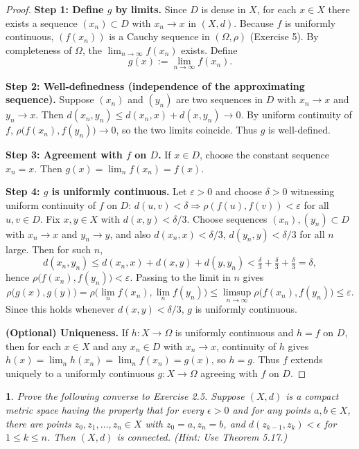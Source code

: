 \documentclass[12pt, a4paper]{report}
\theoremstyle{spaced}
\newtheorem{exercise}{}
\newcommand{\setexercise}[1]{\setcounter{exercise}{#1-1}}
\begin{document}
\begin{proof}
	\textbf{Step 1: Define $g$ by limits.}
	Since $D$ is dense in $X$, for each $x\in X$ there exists a sequence $(x_n)\subset D$
	with $x_n\to x$ in $(X,d)$. Because $f$ is uniformly continuous,
	$(f(x_n))$ is a Cauchy sequence in $(\Omega,\rho)$ (Exercise 5).
	By completeness of $\Omega$, the $\lim_{n\to\infty} f(x_n)$ exists.
	Define
	\[
		g(x):=\lim_{n\to\infty} f(x_n).
	\]

	\textbf{Step 2: Well-definedness (independence of the approximating sequence).}
	Suppose $(x_n)$ and $(y_n)$ are two sequences in $D$ with $x_n\to x$ and $y_n\to x$.
	Then $d(x_n,y_n)\le d(x_n,x)+d(x,y_n)\to 0$.
	By uniform continuity of $f$, $\rho\bigl(f(x_n),f(y_n)\bigr)\to 0$,
	so the two limits coincide. Thus $g$ is well-defined.

	\medskip

	\textbf{Step 3: Agreement with $f$ on $D$.}
	If $x\in D$, choose the constant sequence $x_n=x$. Then
	$g(x)=\lim_n f(x_n)=f(x)$.

	\medskip

	\textbf{Step 4: $g$ is uniformly continuous.}
	Let $\varepsilon>0$ and choose $\delta>0$ witnessing uniform continuity of $f$ on $D$:
	$d(u,v)<\delta \Rightarrow \rho(f(u),f(v))<\varepsilon$ for all $u,v\in D$.
	Fix $x,y\in X$ with $d(x,y)<\delta/3$. Choose sequences $(x_n),(y_n)\subset D$
	with $x_n\to x$ and $y_n\to y$, and also $d(x_n,x)<\delta/3$, $d(y_n,y)<\delta/3$ for all $n$ large.
	Then for such $n$,
	\[
		d(x_n,y_n)\le d(x_n,x)+d(x,y)+d(y,y_n)<\tfrac{\delta}{3}+\tfrac{\delta}{3}+\tfrac{\delta}{3}=\delta,
	\]
	hence $\rho\bigl(f(x_n),f(y_n)\bigr)<\varepsilon$.
	Passing to the limit in $n$ gives
	\[
		\rho\bigl(g(x),g(y)\bigr)
		=\rho\bigl(\lim_n f(x_n),\lim_n f(y_n)\bigr)
		\le \limsup_{n\to\infty}\rho\bigl(f(x_n),f(y_n)\bigr)
		\le \varepsilon.
	\]
	Since this holds whenever $d(x,y)<\delta/3$, $g$ is uniformly continuous.

	\textbf{(Optional) Uniqueness.}
	If $h:X\to\Omega$ is uniformly continuous and $h=f$ on $D$, then for each $x\in X$ and any
	$x_n\in D$ with $x_n\to x$, continuity of $h$ gives
	$h(x)=\lim_n h(x_n)=\lim_n f(x_n)=g(x)$, so $h=g$.
	Thus $f$ extends uniquely to a uniformly continuous $g:X\to\Omega$ agreeing with $f$ on $D$.
\end{proof}


\setexercise{9}
\begin{exercise}
	Prove the following converse to Exercise 2.5. Suppose $(X,d)$ is a compact metric space having the property that for every $\epsilon > 0$ and for any points $a, b \in X$, there are points $z_0, z_1, \ldots, z_n \in X$ with $z_0 = a, z_n = b$, and $d(z_{k-1}, z_k) < \epsilon$ for $1 \leq k \leq n$. Then $(X,d)$ is connected. (Hint: Use Theorem 5.17.)
\end{exercise}
\end{document}
